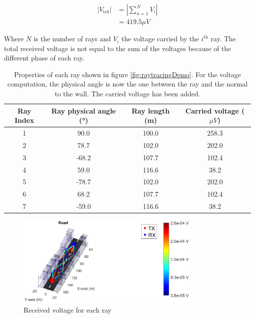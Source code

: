\documentclass[10pt,a4paper]{ULBreport}
\begin{document}
\begin{align*}
    \left|V_{\text{tot}}\right| &= \left|\sum_{n=1}^{N} V_i\right|\\
    &= 419.5 \mu V
\end{align*}
\vspace{-1cm}

Where $N$ is the number of rays and $V_i$ the voltage carried by the $i^{th}$ ray. The total received voltage is not equal to the sum of the voltages because of the different phase of each ray. \\

\begin{table}[H]
    \centering
    \begin{tabular}{|c|c c c|}
        \hline
        Ray Index & Ray physical angle (°) & Ray length (m) & Carried voltage ($\mu V$)\\ \hline
        1 & 90.0 & 100.0 & 258.3\\ \hline
        2 & 78.7 & 102.0 & 202.0\\ \hline
        3 & -68.2 & 107.7 & 102.4\\ \hline
        4 & 59.0 & 116.6 & 38.2\\ \hline
        5 & -78.7 & 102.0 & 202.0\\ \hline
        6 & 68.2 & 107.7 & 102.4\\ \hline
        7 & -59.0 & 116.6 & 38.2\\ \hline
    \end{tabular}
    \caption{Properties of each ray shown in figure \ref{fig:raytracingDemo}. For the voltage computation, the physical angle is now the one between the ray and the normal to the wall. The carried voltage has been added.}
    \label{tab:ray_properties}
\end{table}

\begin{figure}
    \centering
    \includegraphics[width=0.8\textwidth]{3_2.eps}
    \caption{Received voltage for each ray}
    \label{fig:voltageDemo}
\end{figure}
\end{document}
